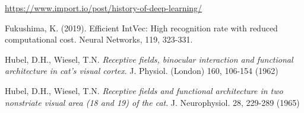 \begin{thebibliography}{}
 \url{https://www.import.io/post/history-of-deep-learning/}

 Fukushima, K. (2019). Efficient IntVec: High recognition rate with reduced computational cost. Neural Networks, 119, 323-331.

 Hubel, D.H., Wiesel, T.N. \textit{Receptive fields, binocular interaction
and functional architecture in cat's visual cortex}. J. Physiol.
(London) 160, 106-154 (1962)

 Hubel, D.H., Wiesel, T.N. \textit{Receptive fields and functional architecture in two nonstriate visual area (18 and 19) of the cat}. J.
Neurophysiol. 28, 229-289 (1965)



















\end{thebibliography}